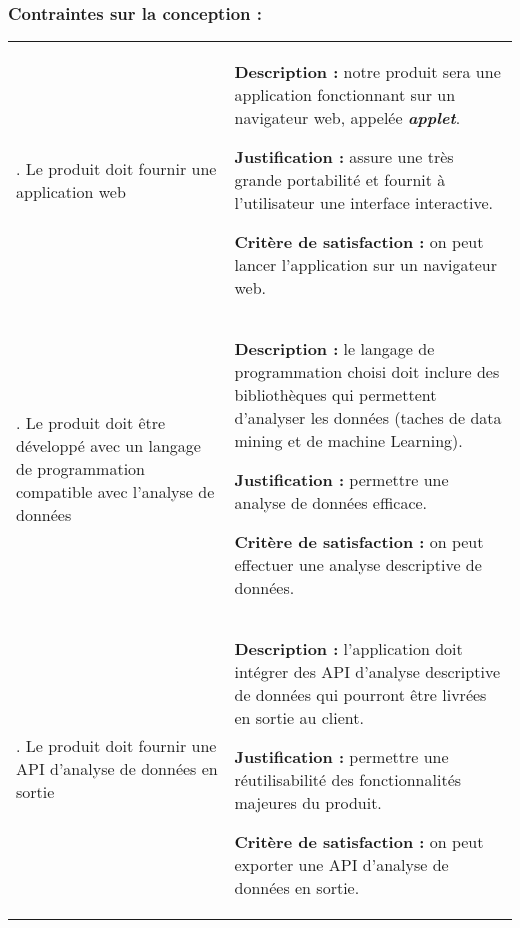 			\subsubsection{Contraintes sur la conception :}
				\begin{center}\begin{longtable}{|>{\centering}m{3cm}|>{\raggedright\arraybackslash}m{10cm}|}			
				\hline \multicolumn{1}{|c}{\textbf{Contrainte}} & \multicolumn{1}{|c|}{\textbf{Fiche}} \\
				\hline 	1. Le produit doit fournir une application web &
						\begin{description}[style=unboxed,leftmargin=0.2cm]
						\item{\textbf{Description :}} notre produit sera une application fonctionnant sur un navigateur web, appelée \textbf{\textit{applet}}.
						\item{\textbf{Justification :}} assure une très grande portabilité et fournit à l'utilisateur une interface interactive.
						\item{\textbf{Critère de satisfaction :}} on peut lancer l'application sur un navigateur web.
						\end{description}\\
				\hline 2. Le produit doit être développé avec un langage de programmation compatible avec l'analyse de données &
						\begin{description}[style=unboxed,leftmargin=0.2cm]
						\item{\textbf{Description :}} le langage de programmation choisi doit inclure des bibliothèques qui permettent d'analyser les données (taches de data mining et de machine Learning).
						\item{\textbf{Justification :}} permettre une analyse de données efficace.
						\item{\textbf{Critère de satisfaction :}} on peut effectuer une analyse descriptive de données.
						\end{description}\\
				\hline 3. Le produit doit fournir une API d'analyse de données en sortie &
						\begin{description}[style=unboxed,leftmargin=0.2cm]
						\item{\textbf{Description :}} l'application doit intégrer des API d'analyse descriptive de données qui pourront être livrées en sortie au client.
						\item{\textbf{Justification :}} permettre une réutilisabilité des fonctionnalités majeures du produit.
						\item{\textbf{Critère de satisfaction :}} on peut exporter une API d'analyse de données en sortie.
						\end{description}\\
				\hline
				\end{longtable}\vspace{1em}\end{center}
				
